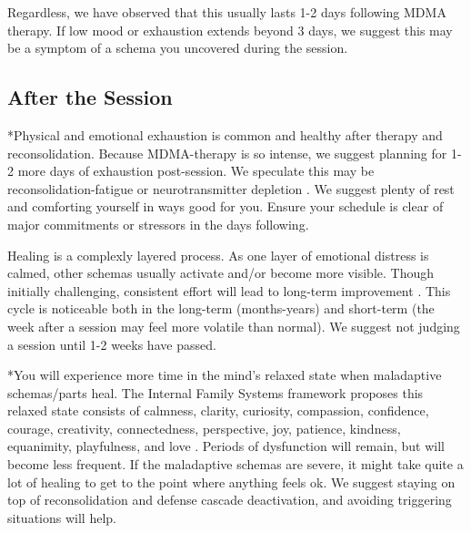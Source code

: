 \documentclass[12pt,letterpaper]{article}
\begin{document}
Regardless, we have observed that this usually lasts 1-2 days following MDMA therapy. If low mood or exhaustion extends beyond 3 days, we suggest this may be a symptom of a schema you uncovered during the session. 
\subsection{After the Session}
\label{after}
*Physical and emotional exhaustion is common and healthy after therapy and reconsolidation. Because MDMA-therapy is so intense, we suggest planning for 1-2 more days of exhaustion post-session. We speculate this may be reconsolidation-fatigue or neurotransmitter depletion \cite{razviPSIP}. We suggest plenty of rest and comforting yourself in ways good for you. Ensure your schedule is clear of major commitments or stressors in the days following. 

Healing is a complexly layered process. As one layer of emotional distress is calmed, other schemas usually activate and/or become more visible. Though initially challenging, consistent effort will lead to long-term improvement \cite{vanderKolkBody}. This cycle is noticeable both in the long-term (months-years) and short-term (the week after a session may feel more volatile than normal). We suggest not judging a session until 1-2 weeks have passed.

*You will experience more time in the mind's relaxed state when maladaptive schemas/parts heal. The Internal Family Systems framework proposes this relaxed state consists of calmness, clarity, curiosity, compassion, confidence, courage, creativity, connectedness, perspective, joy, patience, kindness, equanimity, playfulness, and love \cite{schwartzIFS}. Periods of dysfunction will remain, but will become less frequent. If the maladaptive schemas are severe, it might take quite a lot of healing to get to the point where anything feels ok. We suggest staying on top of reconsolidation and defense cascade deactivation, and avoiding triggering situations will help. 
\end{document}
